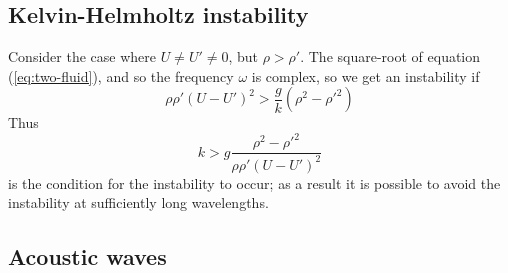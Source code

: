 \subsection{Kelvin-Helmholtz instability}
\label{sec:kelv-inst}

Consider the case where $U \neq U' \neq 0$, but $\rho > \rho'$. The
square-root of equation (\ref{eq:two-fluid}), and so the frequency
$\omega$ is complex, so we get an instability if
\begin{equation}
  \label{eq:58}
  \rho \rho' (U-U')^2 > \frac{g}{k} (\rho^2-\rho'^2)
\end{equation}
Thus
\begin{equation}
  \label{eq:59}
  k > g \frac{\rho^2 - \rho'^2}{\rho \rho' (U - U')^2} 
\end{equation}
is the condition for the instability to occur; as a result it is
possible to avoid the instability at sufficiently long wavelengths.

\subsection{Acoustic waves}
\label{sec:acoustic-waves}

